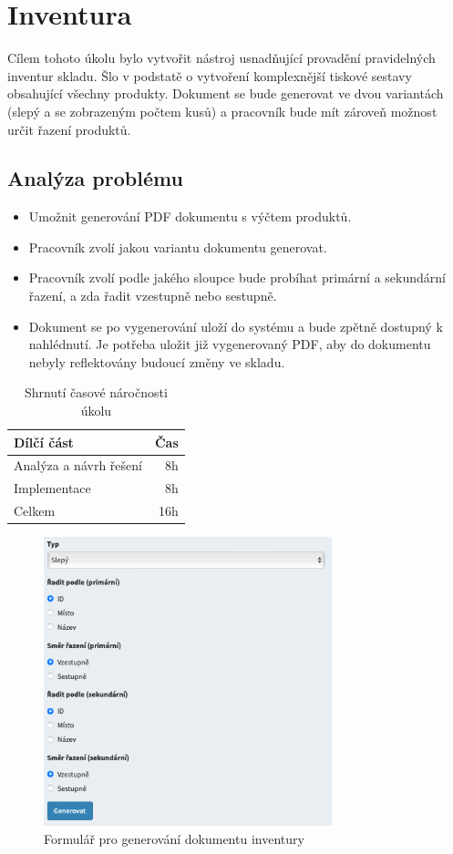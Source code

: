 \section{Inventura}

Cílem tohoto úkolu bylo vytvořit nástroj usnadňující provadění pravidelných inventur skladu. Šlo v podstatě o vytvoření komplexnější tiskové sestavy obsahující všechny produkty. Dokument se bude generovat ve dvou variantách (slepý a se zobrazeným počtem kusů) a pracovník bude mít zároveň možnost určit řazení produktů.



\subsection{Analýza problému}

\begin{itemize}
    \item Umožnit generování PDF dokumentu s výčtem produktů.
    \item Pracovník zvolí jakou variantu dokumentu generovat.
    \item Pracovník zvolí podle jakého sloupce bude probíhat primární a sekundární řazení, a zda řadit vzestupně nebo sestupně.
    \item Dokument se po vygenerování uloží do systému a bude zpětně dostupný k nahlédnutí. Je potřeba uložit již vygenerovaný PDF, aby do dokumentu nebyly reflektovány budoucí změny ve skladu.
\end{itemize}


\begin{table}
	\centering
	\caption[Časová náročnost úkolu na inventuru]{Shrnutí časové náročnosti úkolu}
	\label{tab:TopLevelTableLabel}
	{
		\begin{tabular}{lr}
			\toprule
			Dílčí část & Čas\\
			\midrule
			Analýza a návrh řešení & 8h \\
			Implementace  & 8h \\
            Celkem  & 16h \\
			\midrule
		\end{tabular}
	}
\end{table}

\begin{figure}
    \centering
    \includegraphics[width=0.5\linewidth]{Figures/inventura-pdf.png}
    \caption{Formulář pro generování dokumentu inventury}
    \label{fig:enter-label}
\end{figure}

